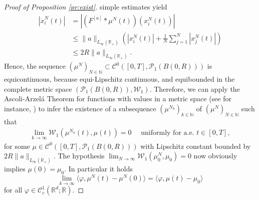 \documentclass[A4paper,11pt]{article}
\theoremstyle{definition}
\newcommand{\N}{\mathbb{N}}
\newcommand{\R}{\mathbb{R}}
\newcommand{\W}{\mathcal{W}}
\newcommand{\Fun}[1]{F^{[#1]}}
\begin{document}
\begin{proof}[Proof of Proposition \ref{pr:exist}]
simple estimates yield
\begin{align*}
|\dot{x}^N_i(t)| &= |(\Fun{a}*\mu^N(t))(x^N_i(t))| \\
&\leq \|a\|_{L_{\infty}(\R_+)} \left( |x^N_i(t)| + \frac{1}{N}\sum^N_{j = 1}|x^N_j(t)|\right) \\
&\leq 2R\|a\|_{L_{\infty}(\R_+)}.
\end{align*}
Hence, the sequence $(\mu^N)_{N \in \N} \subset \mathcal{C}^0([0,T],\mathcal{P}_1(B(0,R)))$ is equicontinuous, because equi-Lipschitz continuous, and equibounded in the complete metric space $(\mathcal{P}_1(B(0,R)),\W_1)$.
Therefore, we can apply the Ascoli-Arzel\'{a} Theorem for functions with values in a metric space (see for instance, \cite[Chapter 7, Theorem 18]{KelleyTop}) to infer the existence of a subsequence $(\mu^{N_k})_{k \in \N}$ of $(\mu^N)_{N \in \N}$ such that
\begin{align}\label{eq:unifconv}
\lim_{k \rightarrow \infty}\W_1(\mu^{N_k}(t),\mu(t)) = 0 \quad \text{ uniformly for a.e. } t \in [0,T],
\end{align}
for some $\mu \in \mathcal{C}^0([0,T],\mathcal{P}_1(B(0,R)))$ with Lipschitz constant bounded by $2R\|a\|_{L_{\infty}(\R_+)}$. The hypothesis $\lim_{N\rightarrow\infty}\W_1(\mu^N_0,\mu_0) = 0$ now obviously implies $\mu(0) = \mu_0$. In particular it holds
\begin{equation}\label{initialdatum}
\lim_{k\to \infty} \langle \varphi, \mu^N(t) - \mu^N(0) \rangle  =  \langle \varphi, \mu(t) - \mu_0 \rangle
\end{equation}
for all $\varphi \in \mathcal{C}^1_c(\R^d;\R)$.



\end{proof}
\end{document}

